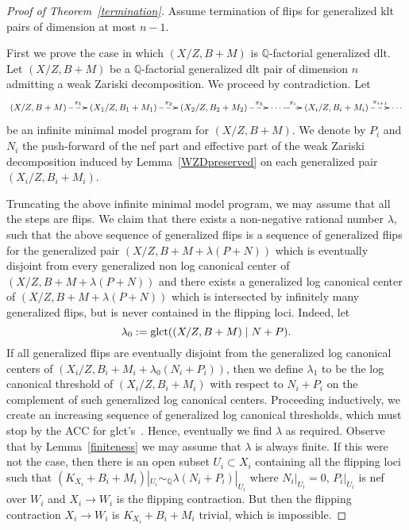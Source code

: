 \documentclass{amsart}
\newcommand{\Q}{\mathbb{Q}}
\renewcommand{\qq}{\mathbb{Q}}
\theoremstyle{remark}
\numberwithin{equation}{section}
\begin{document}
\begin{proof}[Proof of Theorem~\ref{termination}]
Assume termination of flips for generalized klt pairs of dimension at most $n-1$.

First we prove the case in which $(X/Z,B+M)$ is $\qq$-factorial generalized dlt.
Let $(X/Z,B+M)$ be a $\qq$-factorial generalized dlt pair of dimension $n$ admitting a weak Zariski decomposition.
We proceed by contradiction. Let 
\[
 \xymatrix@C=2em{
(X/Z,B+M)\ar@{-->}[r]^-{\pi_1} & (X_1/Z,B_1+M_1)\ar@{-->}[r]^-{\pi_2} & (X_2/Z,B_2+M_2) \ar@{-->}[r]^-{\pi_3} & 
\cdots \ar@{-->}[r]^-{\pi_i} & (X_i/Z,B_i+M_i)\ar@{-->}[r]^-{\pi_{i+1}} & \cdots
 }
\]
be an infinite minimal model program for $(X/Z,B+M)$.
We denote by $P_{i}$ and $N_{i}$ the push-forward 
of the nef part and effective part of the weak Zariski decomposition induced by Lemma~\ref{WZDpreserved}
on each generalized pair $(X_i/Z,B_i+M_i)$.

Truncating the above infinite minimal model program, 
we may assume that all the steps are flips.
We claim that there exists a non-negative rational number $\lambda$, such that 
the above sequence of generalized flips is a sequence of generalized flips for the generalized pair 
$(X/Z,B+M+\lambda(P+N))$ which is eventually disjoint from every generalized non log canonical center
of $(X/Z,B+M+\lambda(P+N))$ and there exists a generalized log canonical center of $(X/Z,B+M+\lambda(P+N))$
which is intersected by infinitely many generalized flips, but is never contained in the flipping loci.
Indeed, let 
\[
\lambda_0 :={\rm glct}((X/Z,B+M) \mid N+P).
\]
If all generalized flips are eventually disjoint from the generalized log canonical centers
of $(X_i/Z,B_i+M_i+\lambda_0 (N_i+P_i))$, then we define $\lambda_1$ to be the log canonical threshold
of $(X_i/Z,B_i+M_i)$ with respect to $N_i+P_i$ on the complement of such generalized log canonical centers.
Proceeding inductively, we create an increasing sequence of generalized log canonical thresholds, 
which must stop by the ACC for glct's~\cite[Theorem 1.5]{BZ16}.
Hence, eventually we find $\lambda$ as required.
Observe that by Lemma~\ref{finiteness} we may assume that $\lambda$ is always finite. If this were not the case, then there is an open subset $U_i\subset X_i$ containing all the flipping loci such that $(K_{X_i}+B_i+M_i)|_{U_i}\sim _\Q \lambda (N_i+P_i)|_{U_i}$ where  $N_i|_{U_i}=0$, $P_i|_{U_i}$ is nef over $W_i$ and $X_i\to W_i$ is the flipping contraction. But then the flipping contraction $X_i\to W_i$ is $K_{X_i}+B_i+M_i$ trivial, which is impossible.


\end{proof}
\end{document}
